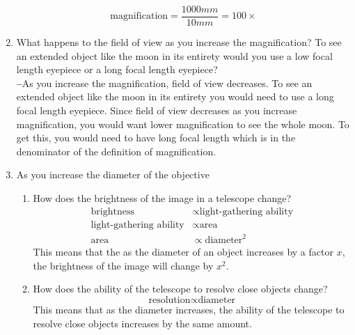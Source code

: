 \documentclass[12pt]{article}
\newcommand\mk{\textbf{--}}
\begin{document}
\begin{enumerate}
\begin{equation*}
                \text{magnification} = \frac{1000mm}{10mm} = \boxed{100\times}
            \end{equation*}
        \item What happens to the field of view as you increase the magnification? To see an extended object like the moon in its entirety would you use a low focal length eyepiece or a long focal length eyepiece?\\
            \mk{}As you increase the magnification, field of view decreases. To see an extended object like the moon in its entirety you would need to use a long focal length eyepiece. Since field of view decreases as you increase magnification, you would want lower magnification to see the whole moon. To get this, you would need to have long focal length which is in the denominator of the definition of magnification. 
        \item As you increase the diameter of the objective \begin{enumerate}
            \item How does the brightness of the image in a telescope change?\\
                \begin{align*}
                    \text{brightness} &\propto \text{light-gathering ability}\\
                    \text{light-gathering ability} &\propto \text{area}\\
                    \text{area} &\propto \text{diameter}^2
                \end{align*}
                This means that the as the diameter of an object increases by a factor $x$, the brightness of the image will change by $x^2$.
            \item How does the ability of the telescope to resolve close objects change?
                \begin{equation*}
                    \text{resolution} \propto \text{diameter} 
                \end{equation*}
                This means that as the diameter increases, the ability of the telescope to resolve close objects increases by the same amount.
        \end{enumerate}
    \end{enumerate}
\end{document}
